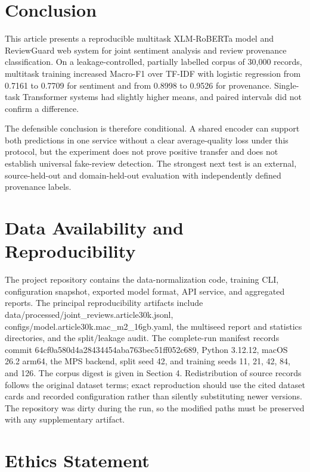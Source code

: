 \documentclass[11pt,a4paper]{article}
\begin{document}
\section{Conclusion}

This article presents a reproducible multitask XLM-RoBERTa model and
ReviewGuard web system for joint sentiment analysis and review
provenance classification. On a leakage-controlled, partially labelled
corpus of 30,000 records, multitask training increased Macro-F1 over
TF-IDF with logistic regression from 0.7161 to 0.7709 for sentiment and
from 0.8998 to 0.9526 for provenance. Single-task Transformer systems
had slightly higher means, and paired intervals did not confirm a
difference.

The defensible conclusion is therefore conditional. A shared encoder can
support both predictions in one service without a clear average-quality
loss under this protocol, but the experiment does not prove positive
transfer and does not establish universal fake-review detection. The
strongest next test is an external, source-held-out and domain-held-out
evaluation with independently defined provenance labels.

\section*{Data Availability and Reproducibility}

The project repository contains the data-normalization code, training
CLI, configuration snapshot, exported model format, API service, and
aggregated reports. The principal reproducibility artifacts include
data/processed/joint\_reviews.article30k.jsonl,
configs/model.article30k.mac\_m2\_16gb.yaml, the multiseed report and
statistics directories, and the split/leakage audit. The complete-run
manifest records commit 64cf0a580d4a28434454aba763bec51ff052c689, Python
3.12.12, macOS 26.2 arm64, the MPS backend, split seed 42, and training
seeds 11, 21, 42, 84, and 126. The corpus digest is given in Section 4.
Redistribution of source records follows the original dataset terms;
exact reproduction should use the cited dataset cards and recorded
configuration rather than silently substituting newer versions. The
repository was dirty during the run, so the modified paths must be
preserved with any supplementary artifact.

\section*{Ethics Statement}
\end{document}
